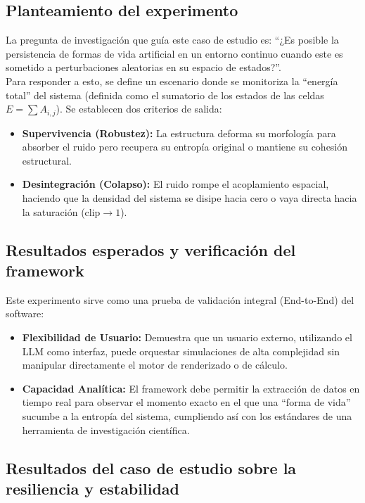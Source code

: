 \documentclass[runningheads]{llncs}
\begin{document}
\subsection{Planteamiento del experimento}
La pregunta de investigación que guía este caso de estudio es: ``¿Es posible la persistencia de formas de vida artificial en un entorno continuo cuando este es sometido a perturbaciones aleatorias en su espacio de estados?''.\\

Para responder a esto, se define un escenario donde se monitoriza la ``energía total'' del sistema (definida como el sumatorio de los estados de las celdas $E = \sum A_{i,j}$). Se establecen dos criterios de salida:
\begin{itemize}
    \item \textbf{Supervivencia (Robustez):} La estructura deforma su morfología para absorber el ruido pero recupera su entropía original o mantiene su cohesión estructural.
    \item \textbf{Desintegración (Colapso):} El ruido rompe el acoplamiento espacial, haciendo que la densidad del sistema se disipe hacia cero o vaya directa hacia la saturación ($\text{clip} \to 1$).
\end{itemize}



\subsection{Resultados esperados y verificación del framework}
Este experimento sirve como una prueba de validación integral (End-to-End) del software:
\begin{itemize}
    \item \textbf{Flexibilidad de Usuario:} Demuestra que un usuario externo, utilizando el LLM como interfaz, puede orquestar simulaciones de alta complejidad sin manipular directamente el motor de renderizado o de cálculo.
    \item \textbf{Capacidad Analítica:} El framework debe permitir la extracción de datos en tiempo real para observar el momento exacto en el que una ``forma de vida'' sucumbe a la entropía del sistema, cumpliendo así con los estándares de una herramienta de investigación científica.
\end{itemize}

\subsection{Resultados del caso de estudio sobre la resiliencia y estabilidad}
\end{document}
